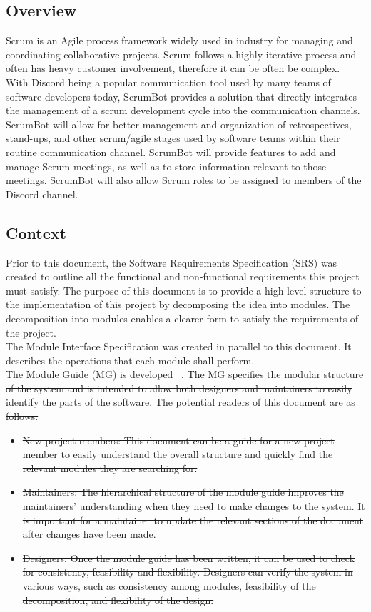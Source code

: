 \documentclass[12pt, titlepage]{article}
\begin{document}
\subsection{Overview}
Scrum is an Agile process framework widely used in industry for managing and coordinating collaborative projects. Scrum follows a highly iterative process and often has heavy customer involvement, therefore it can be often be complex. With Discord being a popular communication tool used by many teams of software developers today, ScrumBot provides a solution that directly integrates the management of a scrum development cycle into the communication channels. ScrumBot will allow for better management and organization of retrospectives, stand-ups, and other scrum/agile stages used by software teams within their routine communication channel. ScrumBot will provide features to add and manage Scrum meetings, as well as to store information relevant to those meetings. ScrumBot will also allow Scrum roles to be assigned to members of the Discord channel.

\subsection{Context}
Prior to this document, the Software Requirements Specification (SRS) was created to outline all the functional and non-functional requirements this project must satisfy. The purpose of this document is to provide a high-level structure to the implementation of this project by decomposing the idea into modules. The decomposition into modules enables a clearer form to satisfy the requirements of the project.\\

\noindent The Module Interface Specification was created in parallel to this document. It describes the operations that each module shall perform.\\

\sout{\noindent The Module Guide (MG) is developed \mbox{~\citep{ParnasEtAl1984}}. The MG specifies the modular structure of the system and is intended to allow both designers and maintainers to easily identify the parts of the software. The potential readers of this document are as follows:}

\begin{itemize}
\item \sout{New project members: This document can be a guide for a new project member to easily understand the overall structure and quickly find the relevant modules they are searching for.}
\item \sout{Maintainers: The hierarchical structure of the module guide improves the maintainers' understanding when they need to make changes to the system. It is important for a maintainer to update the relevant sections of the document after changes have been made.}
\item \sout{Designers: Once the module guide has been written, it can be used to check for consistency, feasibility and flexibility. Designers can verify the system in various ways, such as consistency among modules, feasibility of the decomposition, and flexibility of the design.}
\end{itemize}
\end{document}
